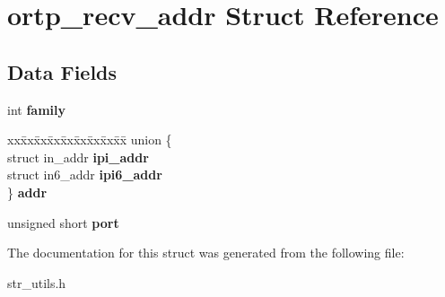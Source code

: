 \section{ortp\+\_\+recv\+\_\+addr Struct Reference}
\label{structortp__recv__addr}
\subsection*{Data Fields}
\begin{DoxyCompactItemize}
\item 
\mbox{\label{structortp__recv__addr_a4b56f849b61aa1c3139b1a6a1ec7ec14}} 
int {\bfseries family}
\item 
\mbox{\label{structortp__recv__addr_af389524373f9fffb9b29b6234a523a0b}} 
\begin{tabbing}
xx\=xx\=xx\=xx\=xx\=xx\=xx\=xx\=xx\=\kill
union \{\\
\>struct in\_addr {\bfseries ipi\_addr}\\
\>struct in6\_addr {\bfseries ipi6\_addr}\\
\} {\bfseries addr}\\

\end{tabbing}\item 
\mbox{\label{structortp__recv__addr_a0e22fa05ebd7cc4e90de312007e1166c}} 
unsigned short {\bfseries port}
\end{DoxyCompactItemize}


The documentation for this struct was generated from the following file\+:\begin{DoxyCompactItemize}
\item 
str\+\_\+utils.\+h\end{DoxyCompactItemize}
